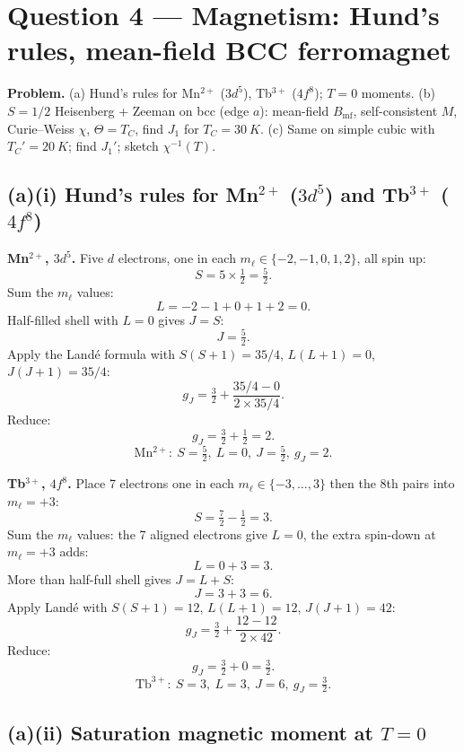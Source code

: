 \documentclass[11pt]{article}
\begin{document}
\section*{Question 4 --- Magnetism: Hund's rules, mean-field BCC ferromagnet}

\textbf{Problem.} (a) Hund's rules for Mn$^{2+}$ ($3d^5$), Tb$^{3+}$ ($4f^8$); $T=0$ moments. (b) $S=1/2$ Heisenberg + Zeeman on bcc (edge $a$): mean-field $B_{\mathrm{mf}}$, self-consistent $M$, Curie--Weiss $\chi$, $\Theta=T_C$, find $J_1$ for $T_C=\SI{30}{K}$. (c) Same on simple cubic with $T_C'=\SI{20}{K}$; find $J_1'$; sketch $\chi^{-1}(T)$.

\subsection*{(a)(i) Hund's rules for Mn$^{2+}$ ($3d^5$) and Tb$^{3+}$ ($4f^8$)}

\textbf{Mn$^{2+}$, $3d^5$.} Five $d$ electrons, one in each $m_\ell\in\{-2,-1,0,1,2\}$, all spin up:
\[
S = 5\times\tfrac12 = \tfrac52.
\]
Sum the $m_\ell$ values:
\[
L = -2-1+0+1+2 = 0.
\]
Half-filled shell with $L=0$ gives $J=S$:
\[
J = \tfrac52.
\]
Apply the Land\'e formula with $S(S+1)=35/4$, $L(L+1)=0$, $J(J+1)=35/4$:
\[
g_J = \tfrac32 + \frac{35/4 - 0}{2\times 35/4}.
\]
Reduce:
\[
g_J = \tfrac32 + \tfrac12 = 2.
\]
\begin{equation}
\boxed{\ \mathrm{Mn^{2+}}:\ S=\tfrac52,\ L=0,\ J=\tfrac52,\ g_J=2.\ }
\label{eq:Mnbox}
\end{equation}

\textbf{Tb$^{3+}$, $4f^8$.} Place 7 electrons one in each $m_\ell\in\{-3,\dots,3\}$ then the 8th pairs into $m_\ell=+3$:
\[
S = \tfrac{7}{2} - \tfrac12 = 3.
\]
Sum the $m_\ell$ values: the 7 aligned electrons give $L=0$, the extra spin-down at $m_\ell = +3$ adds:
\[
L = 0 + 3 = 3.
\]
More than half-full shell gives $J=L+S$:
\[
J = 3 + 3 = 6.
\]
Apply Land\'e with $S(S+1)=12$, $L(L+1)=12$, $J(J+1)=42$:
\[
g_J = \tfrac32 + \frac{12 - 12}{2\times 42}.
\]
Reduce:
\[
g_J = \tfrac32 + 0 = \tfrac32.
\]
\begin{equation}
\boxed{\ \mathrm{Tb^{3+}}:\ S=3,\ L=3,\ J=6,\ g_J=\tfrac32.\ }
\label{eq:Tbbox}
\end{equation}

\subsection*{(a)(ii) Saturation magnetic moment at $T=0$}
\end{document}
